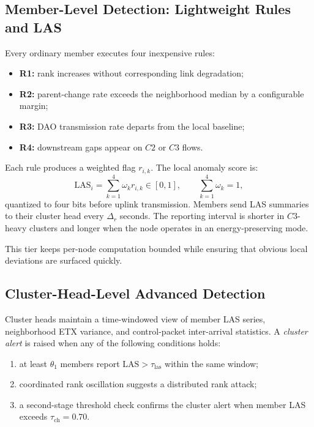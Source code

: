 \subsection{Member-Level Detection: Lightweight Rules and LAS}
Every ordinary member executes four inexpensive rules:
\begin{itemize}
  \item \textbf{R1:} rank increases without corresponding link degradation;
  \item \textbf{R2:} parent-change rate exceeds the neighborhood median by a configurable margin;
  \item \textbf{R3:} DAO transmission rate departs from the local baseline;
  \item \textbf{R4:} downstream gaps appear on $C2$ or $C3$ flows.
\end{itemize}
Each rule produces a weighted flag $r_{i,k}$.
The local anomaly score is:
\begin{equation}
\label{eq:las}
\mathrm{LAS}_i = \sum_{k=1}^{4} \omega_k r_{i,k} \in [0,1], \qquad \sum_{k=1}^{4} \omega_k = 1,
\end{equation}
quantized to four bits before uplink transmission.
Members send LAS summaries to their cluster head every $\Delta_r$ seconds.
The reporting interval is shorter in $C3$-heavy clusters and longer when the node operates in an energy-preserving mode.

This tier keeps per-node computation bounded while ensuring that obvious local deviations are surfaced quickly.

\subsection{Cluster-Head-Level Advanced Detection}
Cluster heads maintain a time-windowed view of member LAS series, neighborhood ETX variance, and control-packet inter-arrival statistics.
A \emph{cluster alert} is raised when any of the following conditions holds:
\begin{enumerate}
  \item at least $\theta_1$ members report $\mathrm{LAS} > \tau_{\mathrm{las}}$ within the same window;
  \item coordinated rank oscillation suggests a distributed rank attack;
  \item a second-stage threshold check confirms the cluster alert when member LAS exceeds $\tau_{\mathrm{ch}} = 0.70$.
\end{enumerate}

